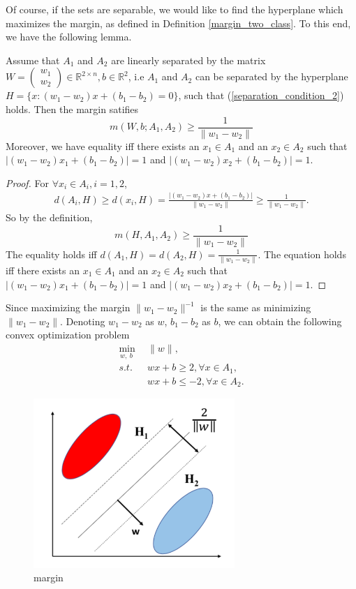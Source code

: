 Of course, if the sets are separable, we would like to find the hyperplane which maximizes the margin, as defined in
Definition \ref{margin_two_class}. To this end, we have the following lemma.
\begin{lemma}
 Assume that $A_1$ and $A_2$ are linearly separated by the matrix $W=
 \begin{pmatrix}
 w_1\\
w_2
 \end{pmatrix}
 \in \mathbb{R}^{2\times n}, 
 b\in
 \mathbb{R}^2 $, i.e $A_1$ and $A_2$ can be separated by the hyperplane $H=\{x:(w_1-w_2)x+(b_1-b_2)=0\}$, such that (\ref{separation_condition_2})
 holds. 
Then the margin satifies
 \begin{equation}
  m(W,b;A_1,A_2)\geq \frac{1}{\|w_1-w_2\|}
 \end{equation}
Moreover, we have equality iff there exists an $x_1\in A_1$ and
an $x_2\in A_2$ such that $|(w_1-w_2)x_1+(b_1-b_2)| = 1$ and $|(w_1-w_2)x_2+(b_1-b_2)| = 1$.

\end{lemma}

\begin{proof}
For $\forall x_i \in A_i, i=1,2$,
\begin{align}
d(A_i, H)\ge d(x_i, H)=\frac{|(w_1-w_2)x+(b_1-b_2)|}{\|w_1-w_2\|}\ge \frac{1}{\|w_1-w_2\|}.
\end{align}
So by the definition, 
 \begin{equation}
  m(H,A_1,A_2)\geq \frac{1}{\|w_1-w_2\|}
 \end{equation}
The equality holds iff $d(A_1, H)= d(A_2, H)=\frac{1}{\|w_1-w_2\|}.$ The equation holds iff there exists an $x_1\in A_1$ and
an $x_2\in A_2$ such that $|(w_1-w_2)x_1+(b_1-b_2)| = 1$ and $|(w_1-w_2)x_2+(b_1-b_2)| = 1$.
\end{proof}


Since maximizing the margin $\|w_1-w_2\|^{-1}$ is the same as minimizing $\|w_1-w_2\|$. Denoting $w_1-w_2$ as $w$, $b_1-b_2$ as $b$, we can obtain the following  convex optimization problem
\begin{align}\label{2class_hard_op}
 \min_{w,~b~}~~&\|w\|,\\
 s.t.~~&wx+b \geq 2, \forall x\in A_1,\\
          &wx+b \leq -2, \forall x \in A_2.
\end{align}

\begin{figure}
	\centering
	\includegraphics[width=3.0in]{./figures/margin.png}   
	\caption{margin}
	\label{margin}
\end{figure}

